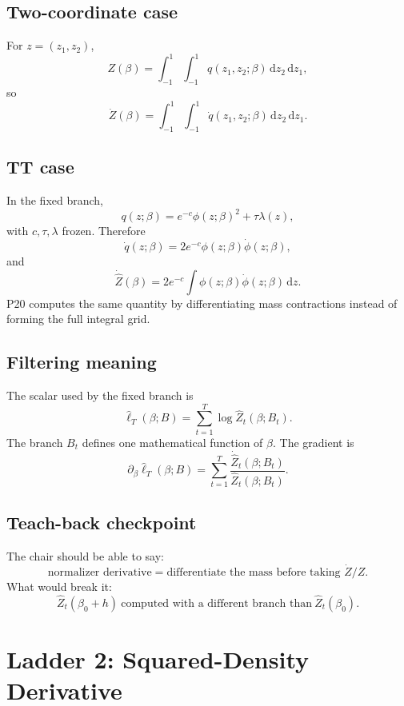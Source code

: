 \documentclass[11pt]{article}
\newcommand{\dd}{\,\mathrm d}
\newcommand{\widehatell}{\widehat\ell}
\newcommand{\widehatZ}{\widehat Z}
\begin{document}
\subsection*{Two-coordinate case}

For \(z=(z_1,z_2)\),
\[
    Z(\beta)
    =
    \int_{-1}^1\int_{-1}^1 q(z_1,z_2;\beta)\dd z_2\dd z_1,
    \tag{P21-15}
\]
so
\[
    \dot Z(\beta)
    =
    \int_{-1}^1\int_{-1}^1
    \dot q(z_1,z_2;\beta)\dd z_2\dd z_1.
    \tag{P21-16}
\]

\subsection*{TT case}

In the fixed branch,
\[
    q(z;\beta)=e^{-c}\phi(z;\beta)^2+\tau\lambda(z),
    \tag{P21-17}
\]
with \(c,\tau,\lambda\) frozen.  Therefore
\[
    \dot q(z;\beta)=2e^{-c}\phi(z;\beta)\dot\phi(z;\beta),
    \tag{P21-18}
\]
and
\[
    \dot{\widehatZ}(\beta)
    =
    2e^{-c}\int\phi(z;\beta)\dot\phi(z;\beta)\dd z.
    \tag{P21-19}
\]
P20 computes the same quantity by differentiating mass contractions instead of
forming the full integral grid.

\subsection*{Filtering meaning}

The scalar used by the fixed branch is
\[
    \widehatell_T(\beta;B)
    =
    \sum_{t=1}^T\log\widehatZ_t(\beta;B_t).
    \tag{P21-20}
\]
The branch \(B_t\) defines one mathematical function of \(\beta\).  The
gradient is
\[
    \partial_\beta\widehatell_T(\beta;B)
    =
    \sum_{t=1}^T
    \frac{\dot{\widehatZ}_t(\beta;B_t)}
    {\widehatZ_t(\beta;B_t)}.
    \tag{P21-21}
\]

\subsection*{Teach-back checkpoint}

The chair should be able to say:
\[
    \text{normalizer derivative}
    =
    \text{differentiate the mass before taking } \dot Z/Z.
    \tag{P21-22}
\]
What would break it:
\[
    \widehatZ_t(\beta_0+h)\ \text{computed with a different branch than}\
    \widehatZ_t(\beta_0).
    \tag{P21-23}
\]

\section{Ladder 2: Squared-Density Derivative}
\end{document}
